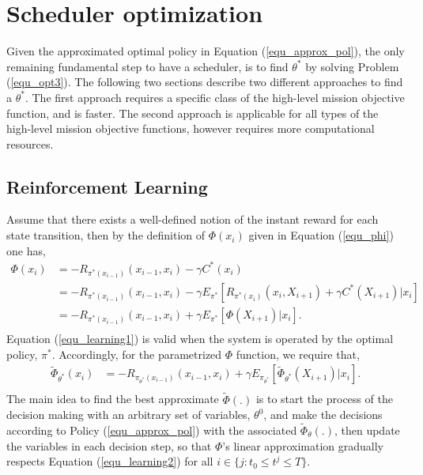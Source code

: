 \documentclass[11pt]{article}
\theoremstyle{definition}
\begin{document}
\section{Scheduler optimization}\label{sec_opt}
Given the approximated optimal policy in Equation (\ref{equ_approx_pol}), the only remaining fundamental step to have a scheduler, is to find $\theta^*$ by solving Problem (\ref{equ_opt3}). The following two sections describe two different approaches to find a $\theta^*$. The first approach requires a specific class of the high-level mission objective function, and is faster. The second approach is applicable for all types of the high-level mission objective functions, however requires more computational resources. 

\subsection{Reinforcement Learning}
Assume that there exists a well-defined notion of the instant reward for each state transition, then by the definition of $\Phi(x_{{i}})$ given in Equation (\ref{equ_phi}) one has,
\begin{equation} \label{equ_learning1}
\begin{aligned}
\Phi(x_{i}) &= - R_{\pi^*(x_{i-1})}(x_{i-1},x_i) - \gamma C^*({x_{i}})\\
&= - R_{\pi^*(x_{i-1})}(x_{i-1},x_i) - \gamma E_{\pi^*}[R_{\pi^*(x_{i})}(x_{i},X_{i+1})  +\gamma C^*({X_{{i+1}}})|x_i]\\
&= - R_{\pi^*(x_{i-1})}(x_{i-1},x_i)  + \gamma E_{\pi^*}[\Phi(X_{{i+1}})|x_i].\\
\end{aligned}
\end{equation}
Equation (\ref{equ_learning1}) is valid when the system is operated by the optimal policy, $\pi^*$. Accordingly, for the parametrized $\Phi$ function, we require that,
\begin{equation} \label{equ_learning2}
\begin{aligned}
\tilde \Phi_{\theta^*}(x_{i}) &=  - R_{\pi_{\theta^*}(x_{i-1})}(x_{i-1},x_i)  + \gamma E_{\pi_{\theta^*}}[\tilde \Phi_{\theta^*}(X_{{i+1}})|x_i].\\
\end{aligned}
\end{equation}
The main idea to find the best approximate $\tilde {\Phi}(.)$ is to start the process of the decision making with an arbitrary set of variables, $\theta^0$, and make the decisions according to Policy (\ref{equ_approx_pol}) with the associated $\tilde \Phi_{\theta}(.)$, then update the variables in each decision step, so that $\Phi$'s linear approximation gradually respects Equation (\ref{equ_learning2}) for all $i \in \{j: t_0 \leq t^j \leq T\}$.
\end{document}
